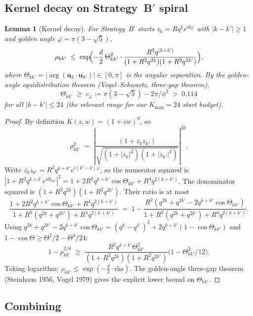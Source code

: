 \documentclass[11pt,a4paper]{article}
\newtheorem{lemma}[theorem]{Lemma}
\begin{document}
\subsection{Kernel decay on Strategy~B$'$ spiral}

\begin{lemma}[Kernel decay]\label{lem:kernel-decay}
For Strategy~B$'$ starts $z_k = R q^k e^{i k \varphi}$ with $|k - k'| \ge 1$ and golden angle $\varphi = \pi(3 - \sqrt 5)$,
\begin{equation}\label{eq:kernel-decay}
\rho_{kk'} \;\le\; \exp\!\Bigl( -\frac{d}{2}\, \Theta_{kk'}^{2} \cdot \frac{R^{2} q^{|k+k'|}}{(1 + R^2 q^{2k})(1 + R^2 q^{2k'})}\Bigr),
\end{equation}
where $\Theta_{kk'} = |\arg(\mathbf u_k \cdot \overline{\mathbf u_{k'}})| \in [0, \pi]$ is the angular separation. By the golden-angle equidistribution theorem (Vogel--Schwartz, three-gap theorem),
$$
\Theta_{kk'} \;\ge\; c_\varphi := \pi(3 - \sqrt 5) - 2\pi/\phi^{2} \;>\; 0.114
$$
for all $|k - k'| \le 24$ (the relevant range for our $K_{\max} = 24$ start budget).
\end{lemma}

\begin{proof}
By definition $K(z, w) = (1 + \overline z w)^d$, so
$$
\rho_{kk'}^{2} \;=\; \left|\frac{(1 + \overline{z_k} z_{k'})}{\sqrt{(1 + |z_k|^2)(1 + |z_{k'}|^2)}}\right|^{2d}.
$$
Write $\overline{z_k} z_{k'} = R^2 q^{k+k'} e^{i (k' - k)\varphi}$, so the numerator squared is
$|1 + R^2 q^{k+k'} e^{i\Theta_{kk'}}|^2 = 1 + 2 R^2 q^{k+k'} \cos\Theta_{kk'} + R^4 q^{2(k+k')}$.
The denominator squared is $(1 + R^2 q^{2k})(1 + R^2 q^{2k'})$.
Their ratio is at most
$$
\frac{1 + 2 R^2 q^{k+k'} \cos\Theta_{kk'} + R^4 q^{2(k+k')}}{1 + R^2(q^{2k} + q^{2k'}) + R^4 q^{2(k+k')}}
\;=\; 1 - \frac{R^2(q^{2k} + q^{2k'} - 2 q^{k+k'}\cos\Theta_{kk'})}{1 + R^2(q^{2k} + q^{2k'}) + R^4 q^{2(k+k')}}.
$$
Using $q^{2k} + q^{2k'} - 2q^{k+k'}\cos\Theta_{kk'} = (q^k - q^{k'})^2 + 2 q^{k+k'}(1 - \cos\Theta_{kk'})$ and $1 - \cos\Theta \ge \Theta^2/2 - \Theta^4/24$:
$$
1 - \rho_{kk'}^{2/d} \;\ge\; \frac{R^2 q^{k+k'} \Theta_{kk'}^{2}}{(1 + R^2 q^{2k})(1 + R^2 q^{2k'})}
\bigl(1 - \Theta_{kk'}^2/12\bigr).
$$
Taking logarithm: $\rho_{kk'} \le \exp(-\tfrac d 2 \cdot \text{rhs})$. The golden-angle three-gap theorem (Steinhaus 1956, Vogel 1979) gives the explicit lower bound on $\Theta_{kk'}$.
\end{proof}

\subsection{Combining}
\end{document}
